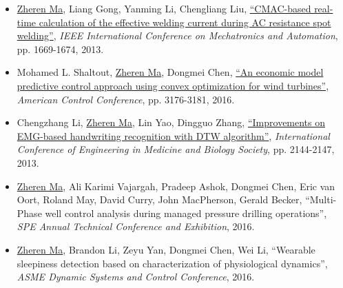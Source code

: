 \documentclass[margin, 9pt]{res} %
\begin{document}
\begin{resume}
\begin{itemize}[leftmargin=*]
	\item \underline{Zheren Ma}, Liang Gong, Yanming Li, Chengliang Liu, 
          \href{http://ieeexplore.ieee.org/xpl/login.jsp?tp=&arnumber=6618166&url=http\%3A\%2F\%2Fieeexplore.ieee.org\%2Fxpls\%2Fabs_all.jsp\%3Farnumber\%3D6618166}
          {``CMAC-based real-time calculation of the effective welding current during AC resistance spot welding''}, 
          \textit{IEEE International Conference on Mechatronics and Automation}, pp. 1669-1674, 2013.

    \item Mohamed L. Shaltout, \underline{Zheren Ma}, Dongmei Chen, 
         \href{http://ieeexplore.ieee.org/xpl/login.jsp?tp=&arnumber=7525406&url=http\%3A\%2F\%2Fieeexplore.ieee.org\%2Fxpls\%2Fabs_all.jsp\%3Farnumber\%3D7525406}
          {``An economic model predictive control approach using convex optimization for wind turbines''}, 
          \textit{American Control Conference}, pp. 3176-3181, 2016.
          
    \item Chengzhang Li, \underline{Zheren Ma}, Lin Yao, Dingguo Zhang, 
          \href{http://ieeexplore.ieee.org/xpl/login.jsp?tp=&arnumber=6609958&url=http\%3A\%2F\%2Fieeexplore.ieee.org\%2Fiel7\%2F6596169\%2F6609410\%2F06609958.pdf\%3Farnumber\%3D6609958}
          {``Improvements on EMG-based handwriting recognition with DTW algorithm''}, 
          \textit{ International Conference of Engineering in Medicine and Biology Society}, pp. 2144-2147, 2013.
          
    \item \underline{Zheren Ma}, Ali Karimi Vajargah, Pradeep Ashok, Dongmei Chen, Eric van Oort, Roland May, David Curry, John MacPherson, Gerald Becker, 
        {``Multi-Phase well control analysis during managed pressure drilling operations''}, 
       \textit{SPE Annual Technical Conference and Exhibition}, 2016.

    \item \underline{Zheren Ma}, Brandon Li, Zeyu Yan, Dongmei Chen, Wei Li, 
        {``Wearable sleepiness detection based on characterization of physiological dynamics''}, 
       \textit{ASME Dynamic Systems and Control Conference}, 2016.
\end{itemize}



\end{resume}
\end{document}
